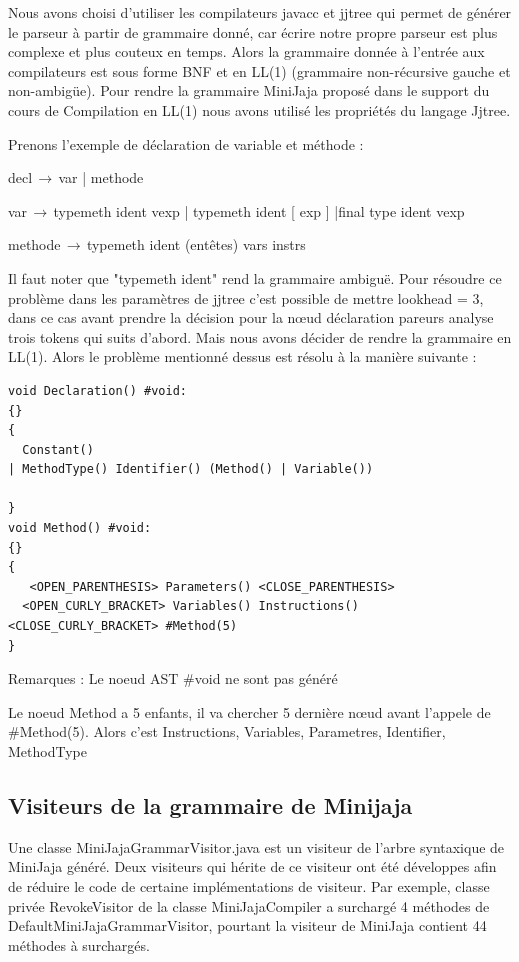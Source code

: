 \documentclass[a4paper,12pt]{report}
\begin{document}
Nous avons choisi d’utiliser  les compilateurs javacc et jjtree qui permet de générer le parseur à partir de grammaire donné, car écrire notre propre parseur est plus complexe et plus couteux en temps. Alors la grammaire donnée à l’entrée aux compilateurs est sous forme BNF et en LL(1) (grammaire non-récursive gauche et non-ambigüe). Pour rendre la grammaire MiniJaja proposé dans le support du cours de Compilation en LL(1) nous avons utilisé les propriétés du langage Jjtree. 

Prenons l’exemple de déclaration de variable et méthode :

decl$\,\to\,$var  |  methode

var$\,\to\,$typemeth ident vexp | typemeth ident [ exp ] |final type ident vexp

methode$\,\to\,$typemeth ident (entêtes) { vars instrs }

Il faut noter que "typemeth ident" rend la grammaire ambiguë. Pour résoudre ce problème dans les paramètres de jjtree c'est possible de mettre lookhead = 3, dans ce cas  avant prendre la décision pour la nœud déclaration pareurs analyse trois tokens qui suits d’abord. Mais nous avons décider de rendre la grammaire en LL(1). Alors le problème mentionné dessus est résolu à la manière suivante : 
 
\lstset{language=Java}
\begin{lstlisting}
void Declaration() #void: 
{}
{
  Constant()
| MethodType() Identifier() (Method() | Variable())

}
void Method() #void: 
{}
{
   <OPEN_PARENTHESIS> Parameters() <CLOSE_PARENTHESIS>
  <OPEN_CURLY_BRACKET> Variables() Instructions()  <CLOSE_CURLY_BRACKET> #Method(5)
}  
\end{lstlisting}

Remarques :
Le noeud AST \#void ne sont pas généré

Le noeud Method a 5 enfants, il va chercher 5 dernière nœud avant l’appele de \#Method(5). Alors c'est Instructions, Variables, Parametres, Identifier, MethodType

\subsection{Visiteurs de la grammaire de Minijaja }
Une classe MiniJajaGrammarVisitor.java est un visiteur de l’arbre syntaxique de MiniJaja généré. Deux visiteurs qui hérite de ce visiteur ont été développes afin de réduire le code de certaine implémentations de visiteur. Par exemple, classe privée RevokeVisitor de la classe MiniJajaCompiler a surchargé 4 méthodes de DefaultMiniJajaGrammarVisitor, pourtant la visiteur de MiniJaja contient 44 méthodes à surchargés.     
\end{document}
